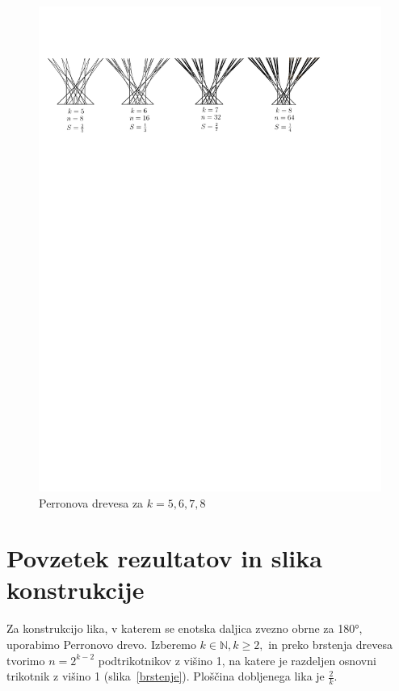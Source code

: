 \documentclass[a4paper, 12pt]{article}
\begin{document}
\begin{figure}[h!]
    \centering
    \includegraphics[width=\textwidth]{ipe_slike/brstenje_k_n.pdf}
    \caption{Perronova drevesa za $ k = 5, 6, 7, 8 $}
    \label{brstenje_n_k}
\end{figure}

\newpage

\section*{Povzetek rezultatov in slika konstrukcije}

Za konstrukcijo lika, v katerem se enotska daljica zvezno obrne za 180°, uporabimo Perronovo drevo. Izberemo $ k \in \mathbb{N}, k \geq 2, $ in preko brstenja drevesa tvorimo $ n = 2^{k-2} $ podtrikotnikov z višino 1, na katere je razdeljen osnovni trikotnik z višino 1 (slika~\ref{brstenje}). Ploščina dobljenega lika je $ \frac{2}{k} $.
\end{document}
